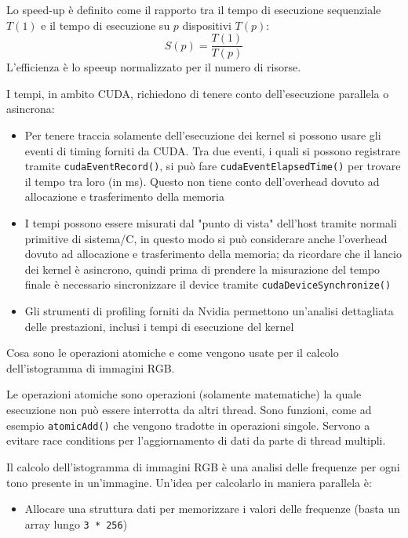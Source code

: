 \begin{questions}
\begin{solution}
    	 Lo speed-up è definito come il rapporto tra il tempo di esecuzione sequenziale $T(1)$ e il tempo di esecuzione su $p$ dispositivi $T(p)$:
    	 $$ S(p) = \frac{T(1)}{T(p)} $$
    	 L'efficienza è lo speeup normalizzato per il numero di risorse.
    	 
    	 I tempi, in ambito CUDA, richiedono di tenere conto dell'esecuzione parallela o asincrona: 
    	 \begin{itemize}
    	 	\item Per tenere traccia solamente dell'esecuzione dei kernel si possono usare gli eventi di timing forniti da CUDA. Tra due eventi, i quali si possono registrare tramite \texttt{cudaEventRecord()}, si può fare \texttt{cudaEventElapsedTime()} per trovare il tempo tra loro (in ms). Questo non tiene conto dell'overhead dovuto ad allocazione e trasferimento della memoria
    	 	
    	 	\item I tempi possono essere misurati dal "punto di vista" dell'host tramite normali primitive di sistema/C, in questo modo si può considerare anche l'overhead dovuto ad allocazione e trasferimento della memoria; da ricordare che il lancio dei kernel è asincrono, quindi prima di prendere la misurazione del tempo finale è necessario sincronizzare il device tramite \texttt{cudaDeviceSynchronize()}
    	 	
    	 	\item Gli strumenti di profiling forniti da Nvidia permettono un'analisi dettagliata delle prestazioni, inclusi i tempi di esecuzione del kernel
    	 \end{itemize}
    \end{solution}
    
    \question Cosa sono le operazioni atomiche e come vengono usate per il calcolo dell'istogramma di immagini RGB.
    
    \begin{solution}
    	Le operazioni atomiche sono operazioni (solamente matematiche) la quale esecuzione non può essere interrotta da altri thread. Sono funzioni, come ad esempio \texttt{atomicAdd()} che vengono tradotte in operazioni singole. Servono a evitare race conditions per l'aggiornamento di dati da parte di thread multipli.
    	
    	Il calcolo dell'istogramma di immagini RGB è una analisi delle frequenze per ogni tono presente in un'immagine. Un'idea per calcolarlo in maniera parallela è:
    	\begin{itemize}
    		\item Allocare una struttura dati per memorizzare i valori delle frequenze (basta un array lungo \texttt{3 * 256})
    		

\end{itemize}
\end{solution}
\end{questions}
